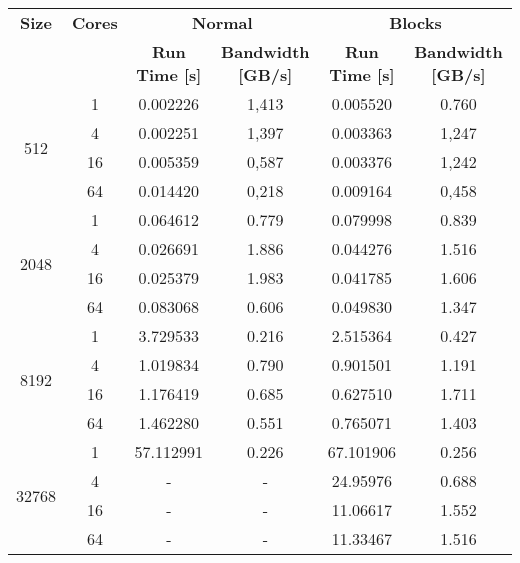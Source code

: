 \begin{tabularx}{\textwidth}{@{} c c c c c c @{}}
    \caption{\label{table:strong-scaling}Strong scaling}\\
    \toprule
        \textbf{Size} & \textbf{Cores} & \multicolumn{2}{c}{\textbf{Normal}} & \multicolumn{2}{c}{\textbf{Blocks}}\\
        \cmidrule(lr){3-4}\cmidrule(lr){5-6}
        & & \textbf{Run Time [s]} & \textbf{Bandwidth [GB/s]} & \textbf{Run Time [s]} & \textbf{Bandwidth [GB/s]} \\
    \midrule
    \endhead
        \multirow{4}{*}{512} & 1	& 0.002226	& 1,413	& 0.005520	& 0.760 \\
                             & 4	& 0.002251	& 1,397	& 0.003363	& 1,247 \\
                             & 16	& 0.005359	& 0,587	& 0.003376	& 1,242 \\
                             & 64	& 0.014420	& 0,218	& 0.009164	& 0,458 \\
    \midrule
        \multirow{4}{*}{2048} & 1   & 0.064612 & 0.779 & 0.079998 & 0.839 \\
                              & 4   & 0.026691 & 1.886 & 0.044276 & 1.516 \\
                              & 16  & 0.025379 & 1.983 & 0.041785 & 1.606 \\
                              & 64  & 0.083068 & 0.606 & 0.049830 & 1.347 \\
        
    \midrule
        \multirow{4}{*}{8192} & 1   & 3.729533 & 0.216 & 2.515364 & 0.427 \\
                              & 4   & 1.019834 & 0.790 & 0.901501 & 1.191 \\
                              & 16  & 1.176419 & 0.685 & 0.627510 & 1.711 \\
                              & 64  & 1.462280 & 0.551 & 0.765071 & 1.403 \\
        
    \midrule
        \multirow{4}{*}{32768} & 1  & 57.112991 & 0.226 & 67.101906 & 0.256 \\
                               & 4  & -         & -     & 24.95976 & 0.688 \\
                               & 16 & -         & -     & 11.06617 & 1.552 \\
                               & 64 & -         & -     & 11.33467 & 1.516 \\
        
    \bottomrule
\end{tabularx}